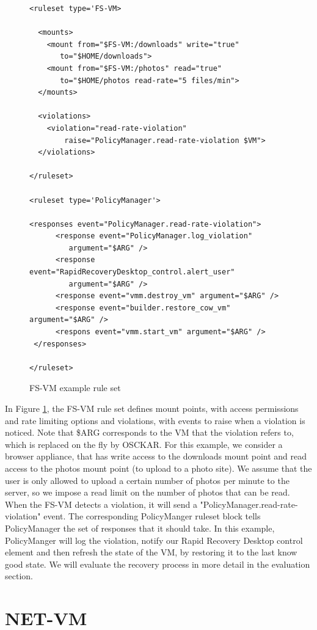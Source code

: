 \begin{figure}[tbp]
\caption{FS-VM example rule set}
\label{lst:fs_vm}

\begin{lstlisting}
<ruleset type='FS-VM>

  <mounts>
    <mount from="$FS-VM:/downloads" write="true"
       to="$HOME/downloads">
    <mount from="$FS-VM:/photos" read="true" 
       to="$HOME/photos read-rate="5 files/min">
  </mounts>

  <violations>
    <violation="read-rate-violation" 
        raise="PolicyManager.read-rate-violation $VM">
  </violations>

</ruleset>

<ruleset type='PolicyManager'>

<responses event="PolicyManager.read-rate-violation">
      <response event="PolicyManager.log_violation" 
         argument="$ARG" />
      <response event="RapidRecoveryDesktop_control.alert_user" 
         argument="$ARG" />      
      <response event="vmm.destroy_vm" argument="$ARG" />
      <response event="builder.restore_cow_vm" argument="$ARG" />
      <respons event="vmm.start_vm" argument="$ARG" />
 </responses>

</ruleset>
\end{lstlisting}
\end{figure}

In Figure \ref{lst:fs_vm}, the FS-VM rule set defines mount points, with access permissions and rate limiting options and violations, with events to raise when a violation is noticed. Note that \$ARG corresponds to the VM that the violation refers to, which is replaced on the fly by OSCKAR. For this example, we consider a browser appliance, that has write access to the downloads mount point and read access to the photos mount point (to upload to a photo site). We assume that the user is only allowed to upload a certain number of photos per minute to the server, so we impose a read limit on the number of photos that can be read. When the FS-VM detects a violation, it will send a "PolicyManager.read-rate-violation" event. The corresponding PolicyManger ruleset block tells PolicyManager the set of responses that it should take. In this example, PolicyManger will log the violation, notify our Rapid Recovery Desktop control element and then refresh the state of the VM, by restoring it to the last know good state. We will evaluate the recovery process in more detail in the evaluation section.

\section{NET-VM}
\label{sec:net-vm-implementation}

